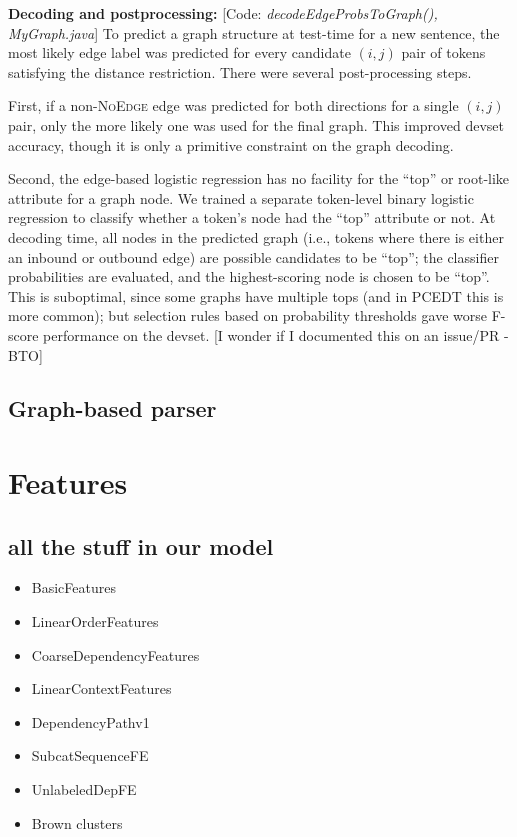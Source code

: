 \documentclass[11pt]{article}
\newcommand{\bocomment}[1]{\textcolor{Bittersweet}{[#1 -BTO]}}
\newcommand{\codenote}[1]{\textcolor{PineGreen}{[Code: \emph{#1}]}}
\begin{document}
\textbf{Decoding and postprocessing:}
\codenote{decodeEdgeProbsToGraph(), MyGraph.java}
To predict a graph structure at test-time for a new sentence,
the most likely edge label was predicted for every candidate $(i,j)$ pair of tokens satisfying the distance restriction.  There were several post-processing steps.

First, if a non-\textsc{NoEdge} edge was predicted for both directions for a single $(i,j)$ pair, only the more likely one was used for the final graph.  This improved devset accuracy, though it is only a primitive constraint on the graph decoding.

Second, the edge-based logistic regression has no facility for the ``top'' or root-like attribute for a graph node.  We trained a separate token-level binary logistic regression to classify whether a token's node had the ``top'' attribute or not.  At decoding time, all nodes in the predicted graph (i.e., tokens where there is either an inbound or outbound edge) are possible candidates to be ``top''; the classifier probabilities are evaluated, and the highest-scoring node is chosen to be ``top''.
This is suboptimal, since some graphs have multiple tops (and in PCEDT this is more common); but selection rules based on probability thresholds gave worse F-score performance on the devset. \bocomment{I wonder if I documented this on an issue/PR}


\subsection{Graph-based parser} \label{s:graphparser}


\section{Features}

\subsection{all the stuff in our model}

\label{s:features}

\begin{itemize}
\item BasicFeatures
\item LinearOrderFeatures
\item CoarseDependencyFeatures
\item LinearContextFeatures
\item DependencyPathv1
\item SubcatSequenceFE
\item UnlabeledDepFE
\item Brown clusters
\end{itemize}
\end{document}

